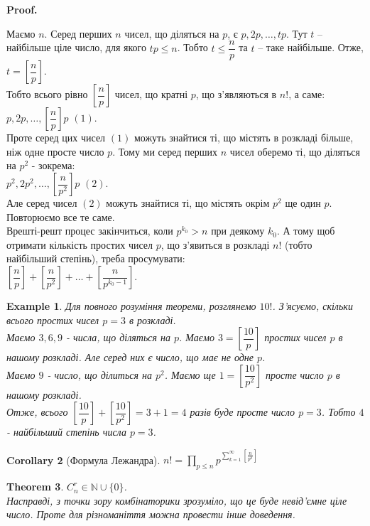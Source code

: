 \documentclass[a4paper, 14pt]{extarticle}
\makeatletter
\theoremstyle{theoremdd}
\newtheorem{theorem}{Theorem}[subsection]
\theoremstyle{theoremdd}
\theoremstyle{theoremdd}
\theoremstyle{theoremdd}
\newtheorem{example}[theorem]{Example}
\theoremstyle{theoremdd}
\theoremstyle{theoremdd}
\theoremstyle{theoremdd}
\theoremstyle{theoremdd}
\newtheorem{corollary}[theorem]{Corollary}
\def\qed{$\blacksquare$}
\renewenvironment{proof}[1][Proof.\\]{\par
\pushQED{\hfill \qed}%
\normalfont \topsep6\p@\@plus6\p@\relax
\trivlist
\item\relax
{\bfseries
#1\@addpunct{.}}\hspace\labelsep\ignorespaces
}{%
\popQED\endtrivlist\@endpefalse
}
\makeatother
\begin{document}
\begin{proof}
Маємо $n$. Серед перших $n$ чисел, що діляться на $p$, є $p,2p,\dots,tp$. Тут $t$ -- найбільше ціле число, для якого $tp \leq n$. Тобто $t \leq \dfrac{n}{p}$ та $t$ -- таке найбільше. Отже, $t = \left[ \dfrac{n}{p} \right]$.\\
Тобто всього рівно $\left[ \dfrac{n}{p} \right]$ чисел, що кратні $p$, що з'являються в $n!$, а саме: $p,2p,\dots, \left[ \dfrac{n}{p} \right]p$ $(1)$.\\
Проте серед цих чисел $(1)$ можуть знайтися ті, що містять в розкладі більше, ніж одне просте число $p$. Тому ми серед перших $n$ чисел оберемо ті, що діляться на $p^2$ - зокрема:\\
$p^2, 2p^2, \dots, \left[ \dfrac{n}{p^2} \right]p$ $(2)$.\\
Але серед чисел $(2)$ можуть знайтися ті, що містять окрім $p^2$ ще один $p$. Повторюємо все те саме.\\
Врешті-решт процес закінчиться, коли $p^{k_0} > n$ при деякому $k_0$. А тому щоб отримати кількість простих чисел $p$, що з'явиться в розкладі $n!$ (тобто найбільший степінь), треба просумувати:\\
$\left[ \dfrac{n}{p} \right] + \left[ \dfrac{n}{p^2} \right] + \dots + \left[ \dfrac{n}{p^{k_0-1}} \right]$.
\end{proof}

\begin{example}
Для повного розуміння теореми, розглянемо $10!$. З'ясуємо, скільки всього простих чисел $p = 3$ в розкладі.\\
Маємо $3,6,9$ - числа, що діляться на $p$. Маємо $3 = \left[ \dfrac{10}{p} \right]$ простих чисел $p$ в нашому розкладі. Але серед них є число, що має не одне $p$.\\
Маємо $9$ - число, що ділиться на $p^2$. Маємо ще $1 = \left[ \dfrac{10}{p^2} \right]$ просте число $p$ в нашому розкладі.\\
Отже, всього $\left[ \dfrac{10}{p} \right] + \left[ \dfrac{10}{p^2} \right] = 3 + 1 = 4$ разів буде просте число $p = 3$. Тобто $4$ - найбільший степінь числа $p = 3$.
\end{example}

\begin{corollary}[Формула Лежандра]
$n! = \displaystyle\prod_{p \leq n} p^{\textstyle \sum_{k=1}^\infty \left[ \frac{n}{p^k} \right]}$
\end{corollary}

\begin{theorem}
\label{C_n^r is positive integer}
$C_n^r \in \mathbb{N} \cup \{0\}$.\\
\textit{Насправді, з точки зору комбінаторики зрозуміло, що це буде невід'ємне ціле число. Проте для різноманіття можна провести інше доведення.}
\end{theorem}
\end{document}

